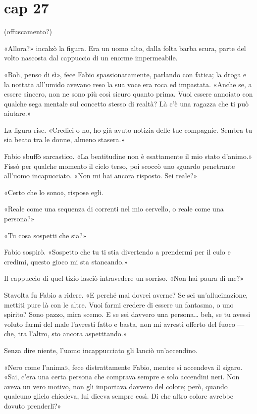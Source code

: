 \chapter{cap 27} 

(offuscamento?)

«Allora?» incalzò la figura. Era un uomo alto, dalla folta barba scura, parte del volto nascosta dal cappuccio di un enorme impermeabile.

«Boh, penso di sì», fece Fabio spassionatamente, parlando con fatica; la droga e la nottata all'umido avevano reso la sua voce era roca ed impastata. «Anche se, a essere sincero, non ne sono più così sicuro quanto prima. Vuoi essere annoiato con qualche sega mentale sul concetto stesso di realtà? Là c'è una ragazza che ti può aiutare.»

La figura rise. «Credici o no, ho già avuto notizia delle tue compagnie. Sembra tu sia beato tra le donne, almeno stasera.»

Fabio sbuffò sarcastico. «La beatitudine non è esattamente il mio stato d'animo.» Fissò per qualche momento il cielo terso, poi scoccò uno sguardo penetrante all'uomo incapucciato. «Non mi hai ancora risposto. Sei reale?»

«Certo che lo sono», rispose egli.

«Reale come una sequenza di correnti nel mio cervello, o reale come una persona?»

«Tu cosa sospetti che sia?»

Fabio sospirò. «Sospetto che tu ti stia divertendo a prendermi per il culo e credimi, questo gioco mi sta stancando.»

Il cappuccio di quel tizio lasciò intravedere un sorriso. «Non hai paura di me?»

Stavolta fu Fabio a ridere. «E perché mai dovrei averne? Se sei un'allucinazione, mettiti pure là con le altre. Vuoi farmi credere di essere un fantasma, o uno spirito? Sono pazzo, mica scemo. E se sei davvero una persona\ldots{} beh, se tu avessi voluto farmi del male l'avresti fatto e basta, non mi avresti offerto del fuoco --- che, tra l'altro, sto ancora aspetttando.»

Senza dire niente, l'uomo incappucciato gli lanciò un'accendino.

«Nero come l'anima», fece distrattamente Fabio, mentre si accendeva il sigaro. «Sai, c'era una certa persona che comprava sempre e solo accendini neri. Non aveva un vero motivo, non gli importava davvero del colore; però, quando qualcuno glielo chiedeva, lui diceva sempre così. Di che altro colore avrebbe dovuto prenderli?»


